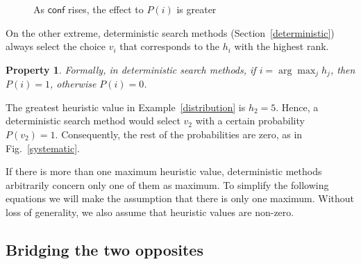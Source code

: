 \documentclass{ws-ijait}
\newtheorem{property}{Property}
\begin{document}
\begin{figure}
  \centering
  
  \caption{As $\mathsf{conf}$ rises, the effect to $P(i)$ is
           greater\label{conf}}
\end{figure}

On the other extreme, deterministic search methods
(Section~\ref{deterministic}) always select the choice $v_i$
that corresponds to the $h_i$ with the highest rank.
\begin{property}
  \label{probability-deterministic}
  Formally, in deterministic search methods, if $i =
  \arg\max_j h_j$, then $P(i) = 1$, otherwise $P(i) = 0$.
\end{property}
\begin{example}
  The greatest heuristic value in Example~\ref{distribution}
  is $h_2 = 5$. Hence, a deterministic search method would
  select $v_2$ with a certain probability $P(v_2) = 1$.
  Consequently, the rest of the probabilities are zero, as
  in Fig.~\ref{systematic}.
\end{example}
If there is more than one maximum heuristic value,
deterministic methods arbitrarily concern only one of them
as maximum. To simplify the following equations we will make
the assumption that there is only one maximum. Without loss
of generality, we also assume that heuristic values are
non-zero.

\subsection{Bridging the two opposites}
\end{document}
